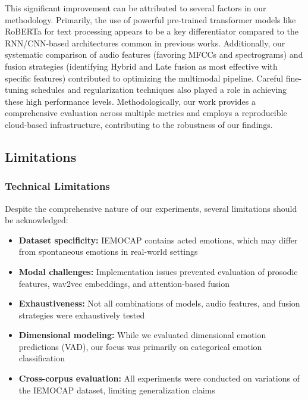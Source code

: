 \documentclass[12pt]{article}
\begin{document}
This significant improvement can be attributed to several factors in our methodology. Primarily, the use of powerful pre-trained transformer models like RoBERTa for text processing appears to be a key differentiator compared to the RNN/CNN-based architectures common in previous works. Additionally, our systematic comparison of audio features (favoring MFCCs and spectrograms) and fusion strategies (identifying Hybrid and Late fusion as most effective with specific features) contributed to optimizing the multimodal pipeline. Careful fine-tuning schedules and regularization techniques also played a role in achieving these high performance levels. Methodologically, our work provides a comprehensive evaluation across multiple metrics and employs a reproducible cloud-based infrastructure, contributing to the robustness of our findings.

\subsection{Limitations}
\subsubsection{Technical Limitations}
Despite the comprehensive nature of our experiments, several limitations should be acknowledged:

\begin{itemize}
    \item \textbf{Dataset specificity:} IEMOCAP contains acted emotions, which may differ from spontaneous emotions in real-world settings
    
    \item \textbf{Modal challenges:} Implementation issues prevented evaluation of prosodic features, wav2vec embeddings, and attention-based fusion
    
    \item \textbf{Exhaustiveness:} Not all combinations of models, audio features, and fusion strategies were exhaustively tested
    
    \item \textbf{Dimensional modeling:} While we evaluated dimensional emotion predictions (VAD), our focus was primarily on categorical emotion classification
    
    \item \textbf{Cross-corpus evaluation:} All experiments were conducted on variations of the IEMOCAP dataset, limiting generalization claims
\end{itemize}
\end{document}
